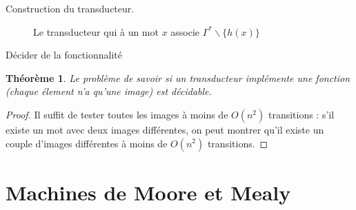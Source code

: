 \documentclass{beamer}
\newtheorem{thm}{Théorème}
\begin{document}
\begin{frame}{Construction du transducteur.}
    \begin{figure}[h] 
        \caption{Le transducteur qui à un mot $x$ associe $\Gamma^* \backslash \{h(x)\}$} \label{autoG-h}
        \begin{center}
        \end{center}
    \end{figure}
\end{frame}

\begin{frame}{Décider de la fonctionnalité}
    \begin{thm}
        Le problème de savoir si un transducteur implémente une fonction (chaque élement n'a qu'une image) est décidable.
    \end{thm}
    \begin{proof}
        Il suffit de tester toutes les images à moins de $O(n^2)$ transitions : s'il existe un mot avec deux images différentes,
        on peut montrer qu'il existe un couple d'images différentes à moins de $O(n^2)$ transitions.
    \end{proof}
\end{frame}

\section{Machines de Moore et Mealy}
\end{document}
